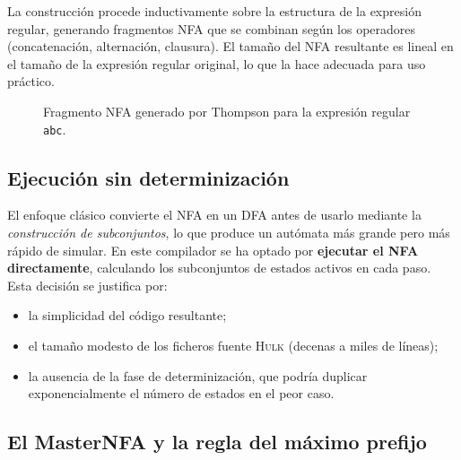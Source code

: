 \documentclass[11pt,a4paper,oneside,openany]{report}
\newcommand{\hulk}{\textsc{Hulk}}
\newcommand{\code}[1]{\texttt{#1}}
\begin{document}
La construcción procede inductivamente sobre la estructura de la expresión regular,
generando fragmentos NFA que se combinan según los operadores (concatenación,
alternación, clausura). El tamaño del NFA resultante es lineal en el tamaño de la
expresión regular original, lo que la hace adecuada para uso práctico.

\begin{figure}[H]
\centering
{}
\caption{Fragmento NFA generado por Thompson para la expresión regular
  \code{abc}.}
\label{fig:nfa-abc}
\end{figure}

\subsection{Ejecución sin determinización}

El enfoque clásico convierte el NFA en un DFA antes de usarlo mediante la
\textit{construcción de subconjuntos}, lo que produce un autómata más grande pero más
rápido de simular. En este compilador se ha optado por \textbf{ejecutar el NFA
directamente}, calculando los subconjuntos de estados activos en cada paso. Esta
decisión se justifica por:

\begin{itemize}
  \item la simplicidad del código resultante;
  \item el tamaño modesto de los ficheros fuente \hulk{} (decenas a miles de líneas);
  \item la ausencia de la fase de determinización, que podría duplicar exponencialmente
    el número de estados en el peor caso.
\end{itemize}

\subsection{El MasterNFA y la regla del máximo prefijo}
\end{document}
